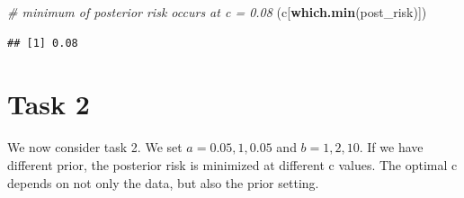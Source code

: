 \documentclass[
]{article}
\newenvironment{Shaded}{\begin{snugshade}}{\end{snugshade}}
\newcommand{\CommentTok}[1]{\textcolor[rgb]{0.56,0.35,0.01}{\textit{#1}}}
\newcommand{\KeywordTok}[1]{\textcolor[rgb]{0.13,0.29,0.53}{\textbf{#1}}}
\newcommand{\NormalTok}[1]{#1}
\begin{document}
\begin{Shaded}
\begin{Highlighting}[]
\CommentTok{# minimum of posterior risk occurs at c = 0.08}
\NormalTok{(c[}\KeywordTok{which.min}\NormalTok{(post_risk)])}
\end{Highlighting}
\end{Shaded}

\begin{verbatim}
## [1] 0.08
\end{verbatim}

\hypertarget{task-2}{%
\section{Task 2}\label{task-2}}

We now consider task 2. We set \(a = 0.05, 1, 0.05\) and
\(b = 1, 2, 10\). If we have different prior, the posterior risk is
minimized at different c values. The optimal c depends on not only the
data, but also the prior setting.
\end{document}
